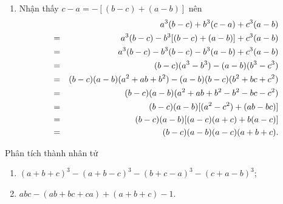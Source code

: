 \begin{bt}
{\begin{enumerate}
	\item Nhận thấy $c-a=-[(b-c)+(a-b)]$ nên
	\allowdisplaybreaks
	\begin{eqnarray*}
		& &a^3(b-c)+b^3(c-a)+c^3(a-b)\notag\\
		&= &a^3(b-c)-b^3[(b-c)+(a-b)]+c^3(a-b)\notag\\
		&= &a^3(b-c)-b^3(b-c)-b^3(a-b)+c^3(a-b)\notag\\
		&= &(b-c)(a^3-b^3)-(a-b)(b^3-c^3)\notag\\
		&= &(b-c)(a-b)(a^2+ab+b^2)-(a-b)(b-c)(b^2+bc+c^2)\notag\\
		&= &(b-c)(a-b)(a^2+ab+b^2-b^2-bc-c^2)\notag\\
		&= &(b-c)(a-b)[(a^2-c^2)+(ab-bc)]\notag\\
		&= &(b-c)(a-b)[(a-c)(a+c)+b(a-c)]\notag\\
		&= &(b-c)(a-b)(a-c)(a+b+c).\notag
	\end{eqnarray*}

\end{enumerate}
}
\end{bt}

\begin{bt}%
	Phân tích thành nhân tử
	\begin{enumerate}
		\item $(a+b+c)^3 - (a+b-c)^3 - (b+c-a)^3 - (c+a-b)^3$;
		\item $abc-(ab+bc+ca)+(a+b+c)-1$.
	\end{enumerate}
\end{bt}

